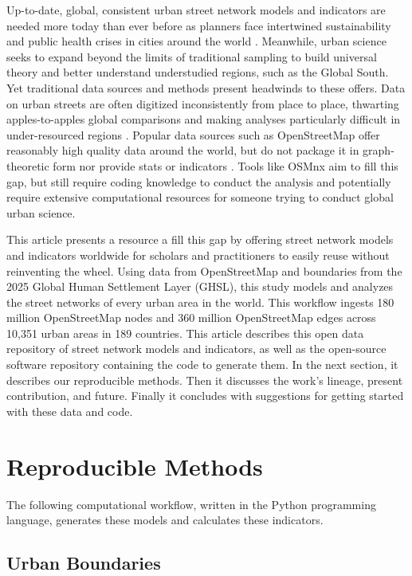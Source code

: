 \documentclass[12pt,letterpaper]{article} %
\begin{document}
Up-to-date, global, consistent urban street network models and indicators are needed more today than ever before as planners face intertwined sustainability and public health crises in cities around the world \citep{giles-corti_creating_2022}. Meanwhile, urban science seeks to expand beyond the limits of traditional sampling to build universal theory and better understand understudied regions, such as the Global South. Yet traditional data sources and methods present headwinds to these offers. Data on urban streets are often digitized inconsistently from place to place, thwarting apples-to-apples global comparisons and making analyses particularly difficult in under-resourced regions \citep{liu_generalized_2022}. Popular data sources such as OpenStreetMap offer reasonably high quality data around the world, but do not package it in graph-theoretic form nor provide stats or indicators \citep{boeing_modeling_2025}. Tools like OSMnx aim to fill this gap, but still require coding knowledge to conduct the analysis and potentially require extensive computational resources for someone trying to conduct global urban science.

This article presents a resource a fill this gap by offering street network models and indicators worldwide for scholars and practitioners to easily reuse without reinventing the wheel. Using data from OpenStreetMap and boundaries from the 2025 Global Human Settlement Layer (GHSL), this study models and analyzes the street networks of every urban area in the world. This workflow ingests 180 million OpenStreetMap nodes and 360 million OpenStreetMap edges across 10,351 urban areas in 189 countries. This article describes this open data repository of street network models and indicators, as well as the open-source software repository containing the code to generate them. In the next section, it describes our reproducible methods. Then it discusses the work's lineage, present contribution, and future. Finally it concludes with suggestions for getting started with these data and code.

\section{Reproducible Methods}

The following computational workflow, written in the Python programming language, generates these models and calculates these indicators.

\subsection{Urban Boundaries}
\end{document}
